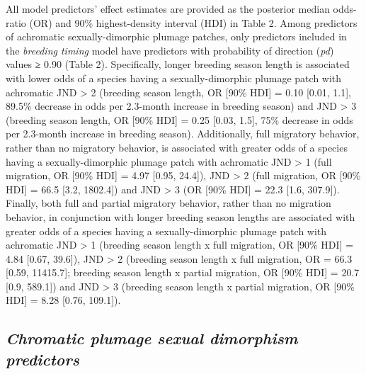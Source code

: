 \documentclass[
  a4paper,
]{article}
\begin{document}
All model predictors' effect estimates are provided as the posterior
median odds-ratio (OR) and 90\% highest-density interval (HDI) in Table
2. Among predictors of achromatic sexually-dimorphic plumage patches,
only predictors included in the \emph{breeding timing} model have
predictors with probability of direction (\emph{pd}) values ≥ 0.90
(Table 2). Specifically, longer breeding season length is associated
with lower odds of a species having a sexually-dimorphic plumage patch
with achromatic JND \textgreater{} 2 (breeding season length, OR {[}90\%
HDI{]} = 0.10 {[}0.01, 1.1{]}, 89.5\% decrease in odds per 2.3-month
increase in breeding season) and JND \textgreater{} 3 (breeding season
length, OR {[}90\% HDI{]} = 0.25 {[}0.03, 1.5{]}, 75\% decrease in odds
per 2.3-month increase in breeding season). Additionally, full migratory
behavior, rather than no migratory behavior, is associated with greater
odds of a species having a sexually-dimorphic plumage patch with
achromatic JND \textgreater{} 1 (full migration, OR {[}90\% HDI{]} =
4.97 {[}0.95, 24.4{]}), JND \textgreater{} 2 (full migration, OR {[}90\%
HDI{]} = 66.5 {[}3.2, 1802.4{]}) and JND \textgreater{} 3 (OR {[}90\%
HDI{]} = 22.3 {[}1.6, 307.9{]}). Finally, both full and partial
migratory behavior, rather than no migration behavior, in conjunction
with longer breeding season lengths are associated with greater odds of
a species having a sexually-dimorphic plumage patch with achromatic JND
\textgreater{} 1 (breeding season length x full migration, OR {[}90\%
HDI{]} = 4.84 {[}0.67, 39.6{]}), JND \textgreater{} 2 (breeding season
length x full migration, OR = 66.3 {[}0.59, 11415.7{]}; breeding season
length x partial migration, OR {[}90\% HDI{]} = 20.7 {[}0.9, 589.1{]})
and JND \textgreater{} 3 (breeding season length x partial migration, OR
{[}90\% HDI{]} = 8.28 {[}0.76, 109.1{]}).

\hypertarget{chromatic-plumage-sexual-dimorphism-predictors}{%
\subsection{\texorpdfstring{\emph{Chromatic plumage sexual dimorphism
predictors}}{Chromatic plumage sexual dimorphism predictors}}\label{chromatic-plumage-sexual-dimorphism-predictors}}
\end{document}
